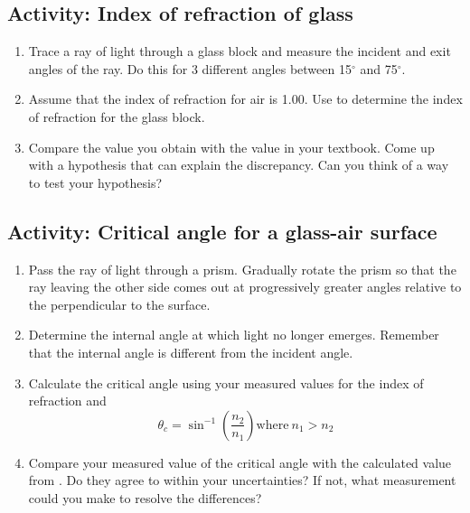 \subsection{Activity: Index of refraction of glass}
\begin{enumerate}
\item
	Trace a ray of light through a glass block and measure the incident and exit angles of the ray.  Do this for 3 different angles between 15$^{\circ}$ and 75$^{\circ}$.
	\item Assume that the index of refraction for air is 1.00. Use  to determine the index of refraction for the glass block.
	\item Compare the value you obtain with the value in your textbook.  Come up with a hypothesis that can explain the discrepancy.  Can you think of a way to test your hypothesis?
\end{enumerate}

\subsection{Activity: Critical angle for a glass-air surface}
\begin{enumerate}
\item Pass the ray of light through a prism.  Gradually rotate the prism so that the ray leaving the other side comes out at progressively greater angles relative to the perpendicular to the surface.  
	\item Determine the internal angle at which light no longer emerges.  Remember that the internal angle is different from the incident angle.
	\item Calculate the critical angle using your measured values
	for the index of refraction and 
\begin{equation} \label{e:critang}
	\theta_c = \sin^{-1} \left(\frac{n_2}{n_1}\right) \text{where} \ n_1 > n_2
\end{equation}
	\item Compare your measured value of the critical angle with the calculated value from .  Do they agree to within your uncertainties?  If not, what measurement could you make to resolve the differences?	
\end{enumerate}

